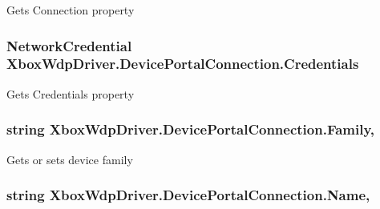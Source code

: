 Gets Connection property 

\subsubsection[{\texorpdfstring{Credentials}{Credentials}}]{\setlength{\rightskip}{0pt plus 5cm}Network\+Credential Xbox\+Wdp\+Driver.\+Device\+Portal\+Connection.\+Credentials\hspace{0.3cm}{\ttfamily [get]}}\hypertarget{class_xbox_wdp_driver_1_1_device_portal_connection_aa3b592f4dc8e65a15b520c7c5f62620e}{}\label{class_xbox_wdp_driver_1_1_device_portal_connection_aa3b592f4dc8e65a15b520c7c5f62620e}


Gets Credentials property 

\subsubsection[{\texorpdfstring{Family}{Family}}]{\setlength{\rightskip}{0pt plus 5cm}string Xbox\+Wdp\+Driver.\+Device\+Portal\+Connection.\+Family\hspace{0.3cm}{\ttfamily [get]}, {\ttfamily [set]}}\hypertarget{class_xbox_wdp_driver_1_1_device_portal_connection_aca1657b3c394128835c245f29f17aba1}{}\label{class_xbox_wdp_driver_1_1_device_portal_connection_aca1657b3c394128835c245f29f17aba1}


Gets or sets device family 

\subsubsection[{\texorpdfstring{Name}{Name}}]{\setlength{\rightskip}{0pt plus 5cm}string Xbox\+Wdp\+Driver.\+Device\+Portal\+Connection.\+Name\hspace{0.3cm}{\ttfamily [get]}, {\ttfamily [set]}}\hypertarget{class_xbox_wdp_driver_1_1_device_portal_connection_a4f8d7e0494e217af4859600b73f35d14}{}\label{class_xbox_wdp_driver_1_1_device_portal_connection_a4f8d7e0494e217af4859600b73f35d14}


